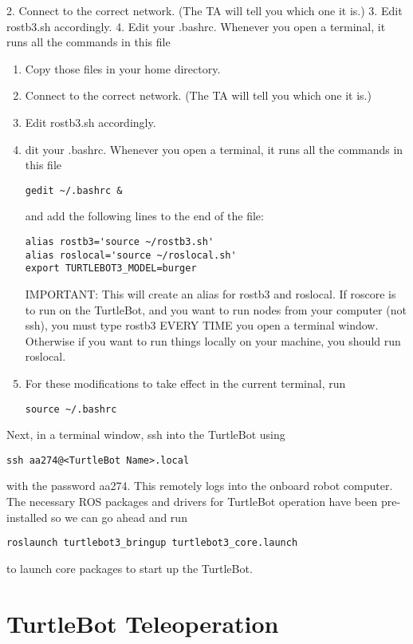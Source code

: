\documentclass{article}
\begin{document}
2. Connect to the correct network. (The TA will tell you which one it is.)
3. Edit rostb3.sh accordingly.
4. Edit your .bashrc. Whenever you open a terminal, it runs all the commands in this file
\begin{enumerate}
	\item Copy those files in your home directory.
	\item Connect to the correct network. (The TA will tell you which one it is.)
	\item Edit rostb3.sh accordingly.
	\item dit your .bashrc. Whenever you open a terminal, it runs all the commands in this file
	\begin{lstlisting}
gedit ~/.bashrc &
	\end{lstlisting}
	and add the following lines to the end of the file:
	\begin{lstlisting}
alias rostb3='source ~/rostb3.sh'
alias roslocal='source ~/roslocal.sh'
export TURTLEBOT3_MODEL=burger
	\end{lstlisting}
	
	IMPORTANT: This will create an alias for rostb3 and roslocal. If roscore is to run on the TurtleBot, and you want to run nodes from your computer (not ssh), you must type rostb3 EVERY TIME you open a terminal window. Otherwise if you want to run things locally on your machine, you should run roslocal.
	\item For these modifications to take effect in the current terminal, run
	\begin{lstlisting}
source ~/.bashrc
	\end{lstlisting}
\end{enumerate}

Next, in a terminal window, ssh into the TurtleBot using 
\begin{lstlisting}
ssh aa274@<TurtleBot Name>.local
\end{lstlisting}

with the password aa274. This remotely logs into the onboard robot computer. The necessary ROS packages
and drivers for TurtleBot operation have been pre-installed so we can go ahead and run

\begin{lstlisting}
roslaunch turtlebot3_bringup turtlebot3_core.launch	
\end{lstlisting}

to launch core packages to start up the TurtleBot.

\section{TurtleBot Teleoperation}
\end{document}
